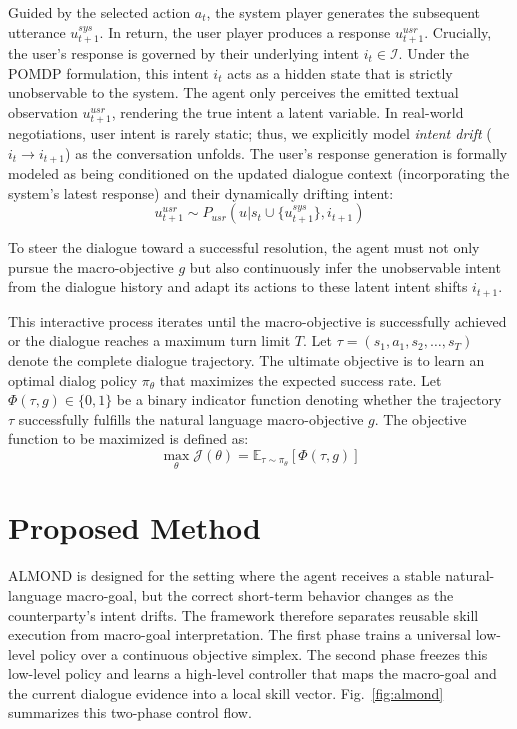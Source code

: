 \documentclass[conference]{IEEEtran}
\begin{document}
Guided by the selected action $a_t$, the system player generates the subsequent utterance $u^{sys}_{t+1}$. In return, the user player produces a response $u^{usr}_{t+1}$. Crucially, the user's response is governed by their underlying intent $i_t \in \mathcal{I}$. Under the POMDP formulation, this intent $i_t$ acts as a hidden state that is strictly unobservable to the system. The agent only perceives the emitted textual observation $u^{usr}_{t+1}$, rendering the true intent a latent variable. In real-world negotiations, user intent is rarely static; thus, we explicitly model \textit{intent drift} ($i_t \rightarrow i_{t+1}$) as the conversation unfolds. The user's response generation is formally modeled as being conditioned on the updated dialogue context (incorporating the system's latest response) and their dynamically drifting intent:
\begin{equation}
    u^{usr}_{t+1} \sim P_{usr}(u | s_t \cup \{u^{sys}_{t+1}\}, i_{t+1})
\end{equation}

To steer the dialogue toward a successful resolution, the agent must not only pursue the macro-objective $g$ but also continuously infer the unobservable intent from the dialogue history and adapt its actions to these latent intent shifts $i_{t+1}$.

This interactive process iterates until the macro-objective is successfully achieved or the dialogue reaches a maximum turn limit $T$. Let $\tau = (s_1, a_1, s_2, \dots, s_T)$ denote the complete dialogue trajectory. The ultimate objective is to learn an optimal dialog policy $\pi_\theta$ that maximizes the expected success rate. Let $\Phi(\tau, g) \in \{0, 1\}$ be a binary indicator function denoting whether the trajectory $\tau$ successfully fulfills the natural language macro-objective $g$. The objective function to be maximized is defined as:
\begin{equation}
    \max_{\theta} \mathcal{J}(\theta) = \mathbb{E}_{\tau \sim \pi_\theta} \left[ \Phi(\tau, g) \right]
\end{equation}

\section{Proposed Method}

ALMOND is designed for the setting where the agent receives a stable
natural-language macro-goal, but the correct short-term behavior changes as the
counterparty's intent drifts. The framework therefore separates reusable skill
execution from macro-goal interpretation. The first phase trains a universal
low-level policy over a continuous objective simplex. The second phase freezes
this low-level policy and learns a high-level controller that maps the
macro-goal and the current dialogue evidence into a local skill vector.
Fig.~\ref{fig:almond} summarizes this two-phase control flow.
\end{document}
